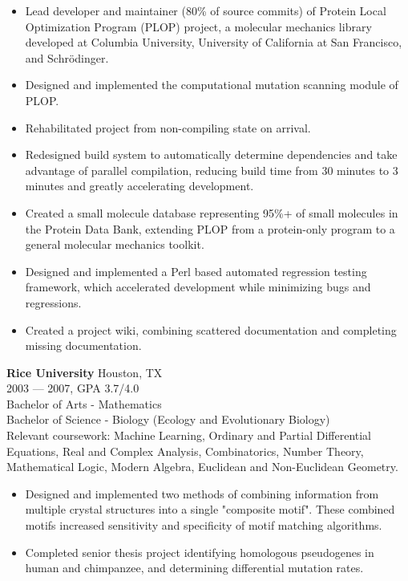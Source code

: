 \begin{itemize}[topsep=1ex, partopsep=0ex, parsep=0ex, itemsep=0.5ex]
    \item Lead developer and maintainer ({\mytilde}80\% of source commits) of Protein Local Optimization Program (PLOP) project, a molecular mechanics library developed at Columbia University, University of California at San Francisco, and Schr\"{o}dinger.
    \item Designed and implemented the computational mutation scanning module of PLOP.
    \item Rehabilitated project from non-compiling state on arrival.
    \item Redesigned build system to automatically determine dependencies and take advantage of parallel compilation, reducing build time from {\mytilde}30 minutes to {\mytilde}3 minutes and greatly accelerating development.
    \item Created a small molecule database representing 95\%+ of small molecules in the Protein Data Bank, extending PLOP from a protein-only program to a general molecular mechanics toolkit.
    \item Designed and implemented a Perl based automated regression testing framework, which accelerated development while minimizing bugs and regressions.
    \item Created a project wiki, combining scattered documentation and completing missing documentation.
\end{itemize}
\vspace{\littleskip}


\clearpage
\myfontsize{\bigheader}
\textbf{Rice University}
\myfontsize{\bodysize}
Houston, TX\\
2003 --- 2007, GPA 3.7/4.0\\
Bachelor of Arts - Mathematics\\
Bachelor of Science - Biology (Ecology and Evolutionary Biology)\\
Relevant coursework: Machine Learning, Ordinary and Partial Differential Equations, Real and Complex Analysis, Combinatorics, Number Theory, Mathematical Logic, Modern Algebra, Euclidean and Non-Euclidean Geometry.
\begin{itemize}[topsep=1ex, partopsep=0ex, parsep=0ex, itemsep=0.5ex]
    \item Designed and implemented two methods of combining information from multiple crystal structures into a single "composite motif". These combined motifs increased sensitivity and specificity of motif matching algorithms.
    \item Completed senior thesis project identifying homologous pseudogenes in human and chimpanzee, and determining differential mutation rates.
\end{itemize}

